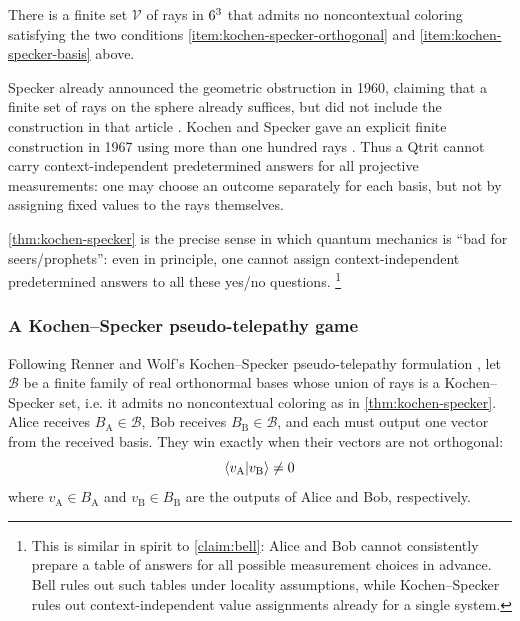 \begin{theorem}\label{thm:kochen-specker}
There is a finite set \(\mathcal V\) of rays in \(6^3\) that admits no noncontextual coloring satisfying the two conditions \ref{item:kochen-specker-orthogonal} and \ref{item:kochen-specker-basis} above.
\end{theorem}

Specker already announced the geometric obstruction in 1960, claiming that a finite set of rays on the sphere already suffices, but did not include the construction in that article
\cite{speckerLogikNichtGleichzeitigEntscheidbarerAussagen,rennerWolfSpeckerHiddenVariables}.
Kochen and Specker gave an explicit finite construction in 1967 using more than one hundred rays
\cite{kochenSpeckerHiddenVariables}.
Thus a Qtrit cannot carry context-independent predetermined answers for all projective measurements: 
one may choose an outcome separately for each basis, but not by assigning fixed values to the rays themselves.

\autoref{thm:kochen-specker} is the precise sense in which quantum mechanics is ``bad for seers/prophets'': 
even in principle, one cannot assign context-independent predetermined answers to all these yes/no questions.%
\footnote{This is similar in spirit to \autoref{claim:bell}: 
Alice and Bob cannot consistently prepare a table of answers for all possible measurement choices in advance. 
Bell rules out such tables under locality assumptions, 
while Kochen--Specker rules out context-independent value assignments already for a single system.}


\subsubsection*{A Kochen--Specker pseudo-telepathy game}


Following Renner and Wolf's Kochen--Specker pseudo-telepathy formulation
\cite{rennerWolfPseudoTelepathy}, let \(\mathcal B\) be a finite family of real orthonormal bases whose union of rays is a Kochen--Specker set, i.e. it admits no noncontextual coloring as in \autoref{thm:kochen-specker}.
Alice receives \(B_{\mathrm{A}}\in\mathcal B\), Bob receives \(B_{\mathrm{B}} \in\mathcal B\), and each must output one vector from the received basis.
They win exactly when their vectors are not orthogonal:
\[
\braket{v_{\mathrm{A}}|v_{\mathrm{B}}}\neq0
\]
where $v_{\mathrm{A}}\in B_{\mathrm{A}}$
and
$v_{\mathrm{B}}\in B_{\mathrm{B}}$ are the outputs of Alice and Bob, respectively.


